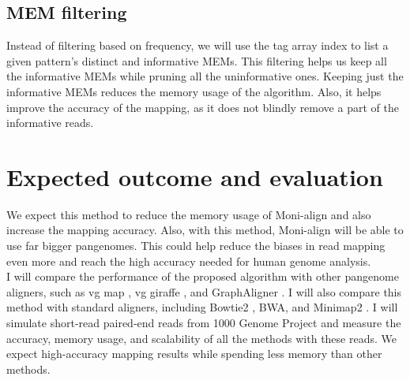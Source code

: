 \documentclass[11pt]{ucthesis}
\begin{document}
\subsection{MEM filtering}
Instead of filtering based on frequency, we will use the tag array index to list a given pattern's distinct and informative MEMs. This filtering helps us keep all the informative MEMs while pruning all the uninformative ones. Keeping just the informative MEMs reduces the memory usage of the algorithm. Also, it helps improve the accuracy of the mapping, as it does not blindly remove a part of the informative reads. 

\section{Expected outcome and evaluation}
We expect this method to reduce the memory usage of Moni-align and also increase the mapping accuracy. Also, with this method, Moni-align will be able to use far bigger pangenomes. This could help reduce the biases in read mapping even more and reach the high accuracy needed for human genome analysis. \\
I will compare the performance of the proposed algorithm with other pangenome aligners, such as vg map \cite{garrison2018variation}, vg giraffe \cite{siren2021pangenomics}, and GraphAligner \cite{rautiainen2020graphaligner}. I will also compare this method with standard aligners, including Bowtie2 \cite{langmead2009ultrafast}, BWA, and Minimap2 \cite{li2018minimap2}. I will simulate short-read paired-end reads from 1000 Genome Project and measure the accuracy, memory usage, and scalability of all the methods with these reads. We expect high-accuracy mapping results while spending less memory than other methods. 




\end{document}
